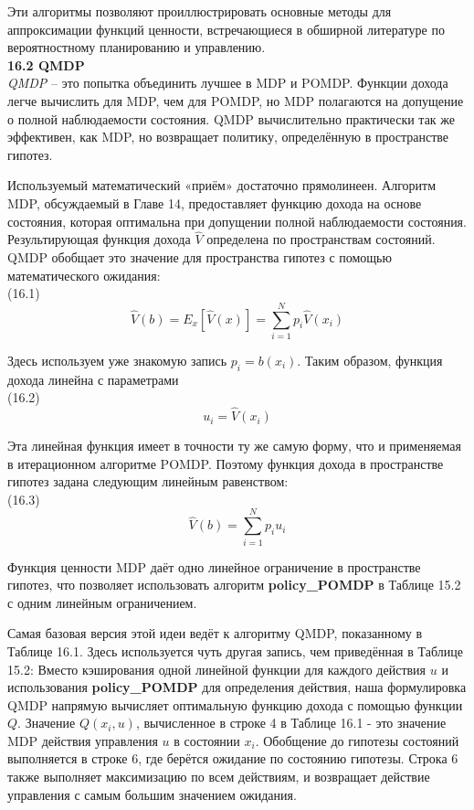 \documentclass[10pt,a4paper]{article}
\begin{document}
Эти алгоритмы позволяют проиллюстрировать основные методы для аппроксимации функций ценности, встречающиеся в обширной литературе по вероятностному планированию и управлению. \\

\textbf{16.2	QMDP}\\

\textit{QMDP} – это попытка объединить лучшее в MDP и POMDP. Функции дохода легче вычислить для MDP, чем для POMDP, но MDP полагаются на допущение о полной наблюдаемости состояния. QMDP вычислительно практически так же эффективен, как MDP, но возвращает политику, определённую в пространстве гипотез.

Используемый математический «приём» достаточно прямолинеен. Алгоритм MDP, обсуждаемый в Главе 14, предоставляет функцию дохода на основе состояния, которая оптимальна при допущении полной наблюдаемости состояния. Результирующая функция дохода $\hat{V}$ определена по пространствам состояний. QMDP обобщает это значение для пространства гипотез с помощью математического ожидания:\\

(16.1)
$$\hat{V}(b)=E_x[\hat{V}(x)]=\sum_{i=1}^Np_i\hat{V}(x_i)$$

Здесь используем уже знакомую запись $p_i  =  b(x_i)$.  Таким образом, функция дохода линейна с параметрами\\

(16.2)
$$u_i=\hat{V}(x_i)$$

Эта линейная функция имеет в точности ту же самую форму, что и применяемая в  итерационном алгоритме POMDP. Поэтому функция дохода в пространстве гипотез задана следующим линейным равенством:\\

(16.3)
$$\hat{V}(b)=\sum_{i=1}^Np_iu_i$$

Функция ценности MDP даёт одно линейное ограничение в пространстве гипотез, что позволяет использовать алгоритм \textbf{policy\_POMDP} в Таблице 15.2 с одним линейным ограничением.

Самая базовая версия этой идеи ведёт к алгоритму QMDP, показанному в Таблице 16.1. Здесь используется чуть другая запись, чем приведённая в Таблице 15.2: Вместо кэширования одной линейной функции для каждого действия $u$ и использования \textbf{policy\_POMDP} для определения действия, наша формулировка QMDP напрямую вычисляет оптимальную функцию дохода с помощью функции $Q$. Значение $Q(x_i, u)$, вычисленное в строке 4 в Таблице 16.1 - это значение MDP действия управления $u$ в состоянии $x_i$. Обобщение до гипотезы состояний выполняется в строке 6, где берётся ожидание по состоянию гипотезы. Строка 6 также выполняет максимизацию по всем действиям, и возвращает действие управления с самым большим значением ожидания.
\end{document}
